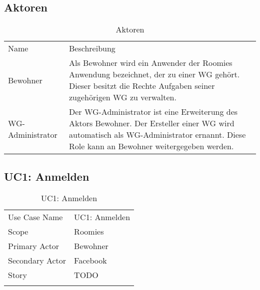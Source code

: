 \subsection{Aktoren}
\begin{table}[H]
	\tablestyle
	\tablealtcolored
	\begin{tabularx}{\textwidth}{lX}
	\tableheadcolor
		\tablehead Name &
		\tablehead Beschreibung \tabularnewline

		\tablebody
			Bewohner &
			Als Bewohner wird ein Anwender der Roomies Anwendung bezeichnet, der zu einer WG gehört. \newline
			Dieser besitzt die Rechte Aufgaben seiner zugehörigen WG zu verwalten.
			\tabularnewline
			WG-Administrator &
			Der WG-Administrator ist eine Erweiterung des Aktors Bewohner. Der Ersteller einer WG wird automatisch als WG-Administrator ernannt. Diese Role kann an Bewohner weitergegeben werden.
	\end{tabularx}
	\caption{Aktoren}
\end{table}

\subsection{UC1: Anmelden}
\begin{table}[H]
	\tablestyle
	\tablealtcolored
	\begin{tabularx}{\textwidth}{lX}
		\tablebody
			Use Case Name &
			UC1: Anmelden
			\tabularnewline
			Scope &
			Roomies
			\tabularnewline
			Primary Actor &
			Bewohner
			\tabularnewline
			Secondary Actor &
			Facebook
			\tabularnewline
			Story &
			TODO
			\tabularnewline
		\tableend
	\end{tabularx}
	\caption{UC1: Anmelden}
\end{table}


